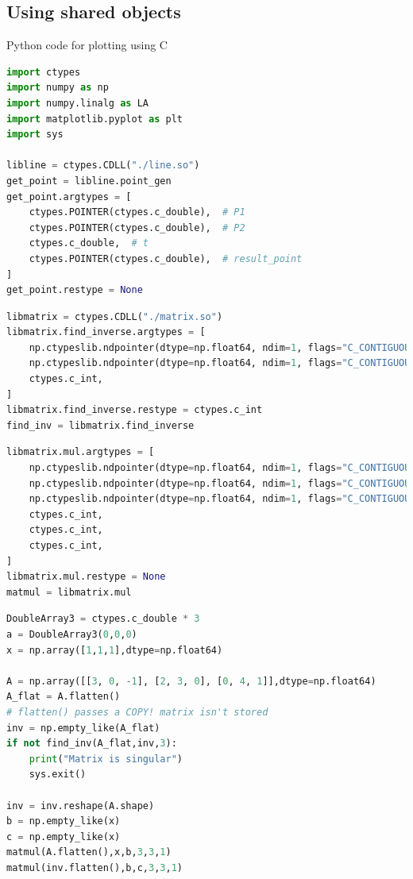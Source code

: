 \documentclass{beamer}
\theoremstyle{remark}
\numberwithin{equation}{section}
\begin{document}
\subsection{Using shared objects}
\begin{frame}[fragile]{Python code for plotting using C}
\begin{lstlisting}[language=Python]
import ctypes
import numpy as np
import numpy.linalg as LA
import matplotlib.pyplot as plt
import sys

libline = ctypes.CDLL("./line.so")
get_point = libline.point_gen
get_point.argtypes = [
    ctypes.POINTER(ctypes.c_double),  # P1
    ctypes.POINTER(ctypes.c_double),  # P2
    ctypes.c_double,  # t
    ctypes.POINTER(ctypes.c_double),  # result_point
]
get_point.restype = None
\end{lstlisting}
\end{frame}
\begin{frame}[fragile]
\begin{lstlisting}[language=Python]
libmatrix = ctypes.CDLL("./matrix.so")
libmatrix.find_inverse.argtypes = [
    np.ctypeslib.ndpointer(dtype=np.float64, ndim=1, flags="C_CONTIGUOUS"),
    np.ctypeslib.ndpointer(dtype=np.float64, ndim=1, flags="C_CONTIGUOUS"),
    ctypes.c_int,
]
libmatrix.find_inverse.restype = ctypes.c_int
find_inv = libmatrix.find_inverse
\end{lstlisting}
\end{frame}
\begin{frame}[fragile]
\begin{lstlisting}[language=Python]
libmatrix.mul.argtypes = [
    np.ctypeslib.ndpointer(dtype=np.float64, ndim=1, flags="C_CONTIGUOUS"),
    np.ctypeslib.ndpointer(dtype=np.float64, ndim=1, flags="C_CONTIGUOUS"),
    np.ctypeslib.ndpointer(dtype=np.float64, ndim=1, flags="C_CONTIGUOUS"),
    ctypes.c_int,
    ctypes.c_int,
    ctypes.c_int,
]
libmatrix.mul.restype = None
matmul = libmatrix.mul
\end{lstlisting}
\end{frame}
\begin{frame}[fragile]
\begin{lstlisting}[language=Python]
DoubleArray3 = ctypes.c_double * 3
a = DoubleArray3(0,0,0)
x = np.array([1,1,1],dtype=np.float64)

A = np.array([[3, 0, -1], [2, 3, 0], [0, 4, 1]],dtype=np.float64)
A_flat = A.flatten()
# flatten() passes a COPY! matrix isn't stored
inv = np.empty_like(A_flat)
if not find_inv(A_flat,inv,3):
    print("Matrix is singular")
    sys.exit()

inv = inv.reshape(A.shape)
b = np.empty_like(x)
c = np.empty_like(x)
matmul(A.flatten(),x,b,3,3,1)
matmul(inv.flatten(),b,c,3,3,1)
\end{lstlisting}
\end{frame}
\end{document}
